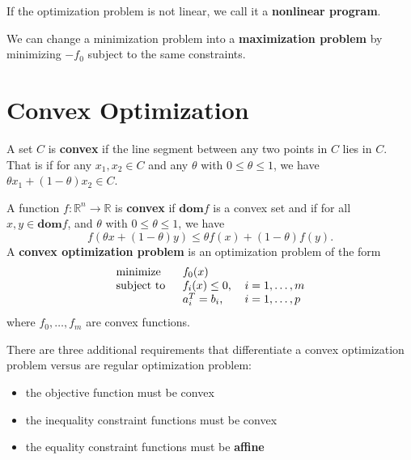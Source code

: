 \documentclass[11pt]{article}
\begin{document}
If the optimization problem is not linear, we call it a {\color{tiananmen}\textbf{nonlinear program}}.

We can change a minimization problem into a {\color{tiananmen}\textbf{maximization problem}} by minimizing {\color{baystate}$-f_0$} subject to the same constraints.

\section{Convex Optimization}

A set {\color{baystate}$C$} is {\color{tiananmen}\textbf{convex}} if the line segment between any two points in $C$ lies in $C$. That is {\color{baystate}if for any $x_1,x_2\in C$ and any $\theta$ with $0\leq\theta\leq 1$, we have $\theta x_1+(1-\theta)x_2\in C$}.

A function {\color{baystate}$f : \mathbb{R}^n\rightarrow\mathbb{R}$} is {\color{tiananmen}\textbf{convex}} if $\mathbf{dom}f$ is a convex set and if for all $x,y\in\mathbf{dom}f$, and $\theta$ with $0\leq\theta\leq 1$, we have
{\color{baystate}
	\begin{equation}
		f\left(\theta x+\left(1-\theta\right)y\right)\leq\theta f(x)+(1-\theta)f(y).
		\label{Convexity}
	\end{equation}
}
A {\color{tiananmen} \textbf{convex optimization problem}} is an optimization problem of the form
{\color{baystate}
	\begin{equation}
		\begin{tabular}{lll}
			\text{minimize }   & $f_0(x)$          & \\
			\text{subject to } & $f_i(x)\leq 0$, & $i=1,\ldots, m$\\
			& $a_i^T = b_i$,      & $i=1,\ldots, p$
		\end{tabular}\label{ConvexOptimization}
	\end{equation}
where $f_0,\ldots,f_m$ are convex functions.
}

There are three additional requirements that differentiate a convex optimization problem versus are regular optimization problem:
{\color{baystate}
\begin{itemize}
	\item the objective function must be convex
	\item the inequality constraint functions must be convex
	\item the equality constraint functions must be {\color{tiananmen}\textbf{affine}}
\end{itemize}
}
\end{document}

